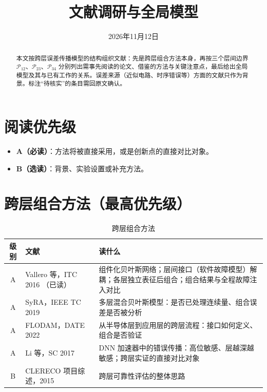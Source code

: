 \documentclass[11pt,a4paper]{ctexart}
\title{文献调研与全局模型}
\date{2026年11月12日}
\begin{document}
\maketitle

\begin{abstract}
本文按跨层误差传播模型的结构组织文献：先是跨层组合方法本身，再按三个层间边界 $\mathcal P_{12}$、$\mathcal P_{23}$、$\mathcal P_{34}$ 分别列出需事先阅读的论文、借鉴的方法与关键注意点，最后给出全局模型及其与已有工作的关系。误差来源（近似电路、时序错误等）方面的文献只作为背景。标注“待核实”的条目需回原文确认。
\end{abstract}

\tableofcontents

\section{阅读优先级}
\begin{itemize}[leftmargin=*]
  \item \textbf{A（必读）}：方法将被直接采用，或是创新点的直接对比对象。
  \item \textbf{B（选读）}：背景、实验设置或补充方法。
\end{itemize}

\section{跨层组合方法（最高优先级）}
\begin{table}[h]
\centering
\small
\begin{tabularx}{\textwidth}{@{}clX@{}}
\toprule
级别 & 文献 & 读什么 \\
\midrule
A & Vallero 等，ITC 2016 \cite{vallero2016}（已读） & 组件化贝叶斯网络；层间接口（软件故障模型）解耦；各层独立表征后组合；组合结果与全程故障注入对比 \\
A & SyRA，IEEE TC 2019 \cite{syra} & 多层混合贝叶斯模型：是否已处理连续量、组合误差是否被分析 \\
A & FLODAM，DATE 2022 \cite{flodam} & 从半导体层到应用层的跨层流程：接口如何定义、组合是否验证 \\
A & Li 等，SC 2017 \cite{li2017} & DNN 加速器中的错误传播：高位敏感、层越深越敏感；跨层实证的直接对比对象 \\
B & CLERECO 项目综述，2015 \cite{clereco} & 跨层可靠性评估的整体思路 \\
\bottomrule
\end{tabularx}
\caption{跨层组合方法}
\end{table}
\end{document}
